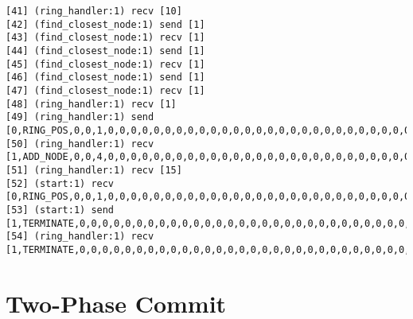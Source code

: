 \begin{lstlisting}[xleftmargin=.01\linewidth, xrightmargin=0.01\linewidth, caption={Message passing caused by the proposer's protocol bug.}, label={lst:paxos_bug}]
[41] (ring_handler:1) recv [10]
[42] (find_closest_node:1) send [1]
[43] (find_closest_node:1) recv [1]
[44] (find_closest_node:1) send [1]
[45] (find_closest_node:1) recv [1]
[46] (find_closest_node:1) send [1]
[47] (find_closest_node:1) recv [1]
[48] (ring_handler:1) recv [1]
[49] (ring_handler:1) send [0,RING_POS,0,0,1,0,0,0,0,0,0,0,0,0,0,0,0,0,0,0,0,0,0,0,0,0,0,0,0,0,0,0,0,0,0,0,0,0]
[50] (ring_handler:1) recv [1,ADD_NODE,0,0,4,0,0,0,0,0,0,0,0,0,0,0,0,0,0,0,0,0,0,0,0,0,0,0,0,0,0,0,0,0,0,0,0,0]
[51] (ring_handler:1) recv [15]
[52] (start:1) recv [0,RING_POS,0,0,1,0,0,0,0,0,0,0,0,0,0,0,0,0,0,0,0,0,0,0,0,0,0,0,0,0,0,0,0,0,0,0,0,0]
[53] (start:1) send [1,TERMINATE,0,0,0,0,0,0,0,0,0,0,0,0,0,0,0,0,0,0,0,0,0,0,0,0,0,0,0,0,0,0,0,0,0,0,0,0]
[54] (ring_handler:1) recv [1,TERMINATE,0,0,0,0,0,0,0,0,0,0,0,0,0,0,0,0,0,0,0,0,0,0,0,0,0,0,0,0,0,0,0,0,0,0,0,0]
\end{lstlisting}

\section{Two-Phase Commit}
